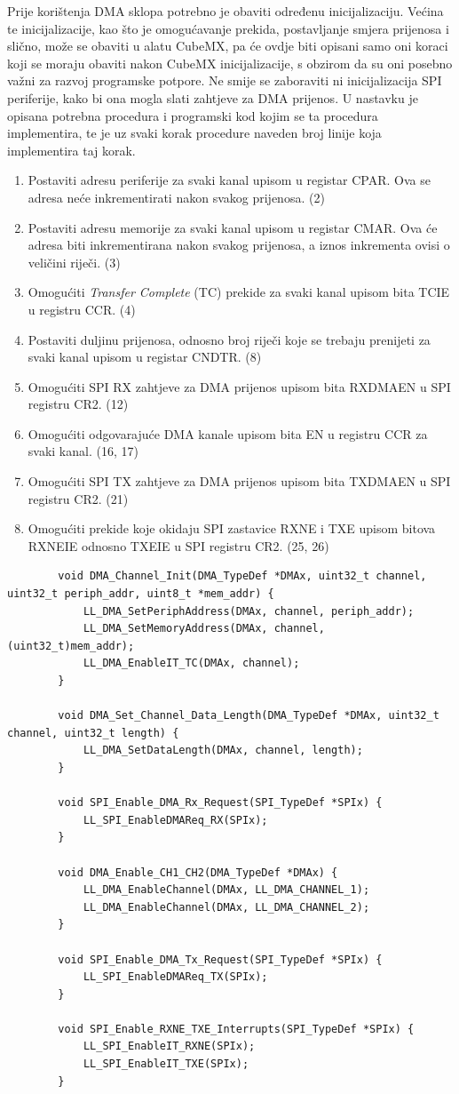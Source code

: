 		Prije korištenja DMA sklopa potrebno je obaviti određenu inicijalizaciju. Većina te inicijalizacije, kao što je omogućavanje prekida, postavljanje smjera prijenosa i slično, može se obaviti u alatu CubeMX, pa će ovdje biti opisani samo oni koraci koji se moraju obaviti nakon CubeMX inicijalizacije, s obzirom da su oni posebno važni za razvoj programske potpore. Ne smije se zaboraviti ni inicijalizacija SPI periferije, kako bi ona mogla slati zahtjeve za DMA prijenos. U nastavku je opisana potrebna procedura i programski kod kojim se ta procedura implementira, te je uz svaki korak procedure naveden broj linije koja implementira taj korak.
		
		\begin{enumerate}
			\item Postaviti adresu periferije za svaki kanal upisom u registar CPAR. Ova se adresa neće inkrementirati nakon svakog prijenosa. (2)
			\item Postaviti adresu memorije za svaki kanal upisom u registar CMAR. Ova će adresa biti inkrementirana nakon svakog prijenosa, a iznos inkrementa ovisi o veličini riječi. (3)
			\item Omogućiti \textit{Transfer Complete} (TC) prekide za svaki kanal upisom bita TCIE u registru CCR. (4)
			\item Postaviti duljinu prijenosa, odnosno broj riječi koje se trebaju prenijeti za svaki kanal upisom u registar CNDTR. (8)
			\item Omogućiti SPI RX zahtjeve za DMA prijenos upisom bita RXDMAEN u SPI registru CR2. (12)
			\item Omogućiti odgovarajuće DMA kanale upisom bita EN u registru CCR za svaki kanal. (16, 17)
			\item Omogućiti SPI TX zahtjeve za DMA prijenos upisom bita TXDMAEN u SPI registru CR2. (21)
			\item Omogućiti prekide koje okidaju SPI zastavice RXNE i TXE upisom bitova RXNEIE odnosno TXEIE u SPI registru CR2. (25, 26)
		\end{enumerate}

		\begin{lstlisting}
		void DMA_Channel_Init(DMA_TypeDef *DMAx, uint32_t channel, uint32_t periph_addr, uint8_t *mem_addr) {
			LL_DMA_SetPeriphAddress(DMAx, channel, periph_addr);
			LL_DMA_SetMemoryAddress(DMAx, channel, (uint32_t)mem_addr);
			LL_DMA_EnableIT_TC(DMAx, channel);
		}

		void DMA_Set_Channel_Data_Length(DMA_TypeDef *DMAx, uint32_t channel, uint32_t length) {
			LL_DMA_SetDataLength(DMAx, channel, length);
		}

		void SPI_Enable_DMA_Rx_Request(SPI_TypeDef *SPIx) {
			LL_SPI_EnableDMAReq_RX(SPIx);
		}

		void DMA_Enable_CH1_CH2(DMA_TypeDef *DMAx) {
			LL_DMA_EnableChannel(DMAx, LL_DMA_CHANNEL_1);
			LL_DMA_EnableChannel(DMAx, LL_DMA_CHANNEL_2);
		}

		void SPI_Enable_DMA_Tx_Request(SPI_TypeDef *SPIx) {
			LL_SPI_EnableDMAReq_TX(SPIx);
		}

		void SPI_Enable_RXNE_TXE_Interrupts(SPI_TypeDef *SPIx) {
			LL_SPI_EnableIT_RXNE(SPIx);
			LL_SPI_EnableIT_TXE(SPIx);
		}
		\end{lstlisting}
		
